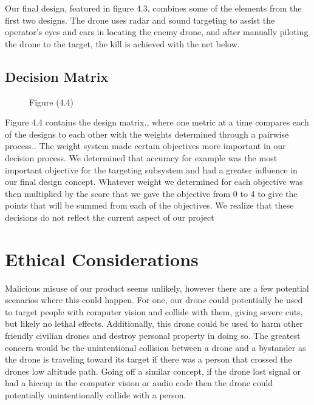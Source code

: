 \documentclass[10pt]{article}
\begin{document}
	Our final design, featured in figure 4.3, combines some of the elements from the first two designs. The drone uses radar and sound targeting to assist the operator’s eyes and ears in locating the enemy drone, and after manually piloting the drone to the target, the kill is achieved with the net below. 

\subsection{Decision Matrix}
%
%
%
%
\begin{figure}
\caption{Figure (4.4)}
\label{fig:4.4}
\end{figure}

Figure 4.4 contains the design matrix., where one metric at a time compares each of the designs to each other with the weights determined through a pairwise process.. The weight system made certain objectives more important in our decision process.  We determined that accuracy for example was the most important objective for the targeting subsystem and had a greater influence in our final design concept.  Whatever weight we determined for each objective was then multiplied by the score that we gave the objective from 0 to 4 to give the points that will be summed from each of the objectives. We realize that these decisions do not reflect the current aspect of our project

\section{Ethical Considerations}
Malicious misuse of our product seems unlikely, however there are a few potential scenarios where this could happen.  For one, our drone could potentially be used to target people with computer vision and collide with them, giving severe cuts, but likely no lethal effects.  Additionally, this drone could be used to harm other friendly civilian drones and destroy personal property in doing so.  The greatest concern would be the unintentional collision between a drone and a bystander as the drone is traveling toward its target if there was a person that crossed the drones low altitude path.  Going off a similar concept, if the drone lost signal or had a hiccup in the computer vision or audio code then the drone could potentially unintentionally collide with a person.  
 
\end{document}
